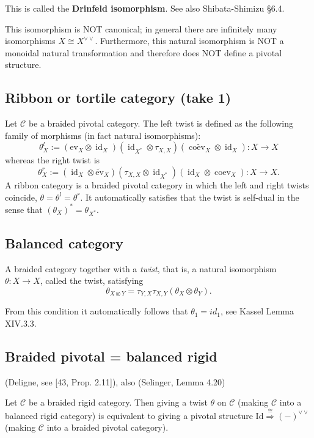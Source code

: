 \documentclass[11pt]{article}
\newcommand{\cat}[1]{\mathcal{#1}}
\theoremstyle{definition}
\begin{document}
This is called the \textbf{Drinfeld isomorphism}. See also Shibata-Shimizu \S 6.4.

This isomorphism is NOT canonical; in general there are infinitely many isomorphisms $X \cong X^{\vee \vee}$. Furthermore, this natural isomorphism is NOT  a monoidal natural transformation and therefore does NOT define a pivotal structure.



\subsection{Ribbon or tortile category (take 1)}
Let \( \mathcal{C} \) be a braided pivotal category. The left twist is defined as the following family of morphisms (in fact natural isomorphisms):
\[ \theta^l_X := (\mathrm{ev}_X \otimes \operatorname{id}_X)(\operatorname{id}_{X^*} \otimes \tau_{X, X})(\widetilde{\operatorname{coev}_X} \otimes \operatorname{id}_X): X \to X \]
whereas the right twist is
\[ \theta_X^r := (\operatorname{id}_X \otimes \widetilde{\mathrm{ev}}_X)(\tau_{X, X} \otimes \operatorname{id}_{X^*})(\operatorname{id}_X \otimes \operatorname{coev}_X): X \to X. \]
A ribbon category is a braided pivotal category in which the left and right twists coincide, \( \theta = \theta^l = \theta^r \). It automatically satisfies that the twist is self-dual in the sense that \( (\theta_X)^* = \theta_{X^*} \).

\subsection{Balanced category}
A braided category together with a \textit{twist}, that is, a natural isomorphism \( \theta: X \to X \), called the twist, satisfying
\[ \theta_{X\otimes Y}=\tau_{Y,X}\tau_{X,Y}(\theta_{X}\otimes \theta_{Y}). \]

From this condition it automatically follows that $\theta_{1} = id_1$, see Kassel Lemma XIV.3.3.

\subsection{Braided pivotal = balanced rigid}\label{sec:br_piv=bal_rig}

(Deligne, see [43, Prop. 2.11]), also (Selinger, Lemma 4.20)

Let $\cat{C}$ be a braided rigid category. Then giving a twist $\theta$ on $\cat{C}$ (making $\cat{C}$ into a balanced rigid category) is equivalent to giving a pivotal structure $\mathrm{Id} \overset{\cong}{\Longrightarrow} (-)^{\vee \vee}$ (making $\cat{C}$ into a braided pivotal category).
\end{document}
